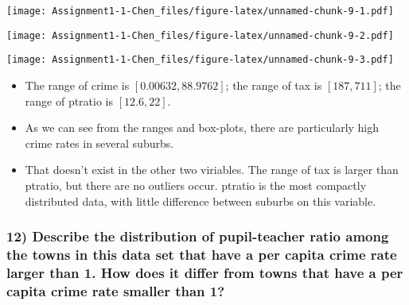 \documentclass[
  12pt,
]{article}
\newenvironment{Shaded}{\begin{snugshade}}{\end{snugshade}}
\newcommand{\AttributeTok}[1]{\textcolor[rgb]{0.77,0.63,0.00}{#1}}
\newcommand{\FunctionTok}[1]{\textcolor[rgb]{0.00,0.00,0.00}{#1}}
\newcommand{\NormalTok}[1]{#1}
\newcommand{\SpecialCharTok}[1]{\textcolor[rgb]{0.00,0.00,0.00}{#1}}
\newcommand{\StringTok}[1]{\textcolor[rgb]{0.31,0.60,0.02}{#1}}
\providecommand{\tightlist}{%
  \setlength{\itemsep}{0pt}\setlength{\parskip}{0pt}}
\begin{document}
\texttt{[image: Assignment1-1-Chen\_files/figure-latex/unnamed-chunk-9-1.pdf]}

\begin{Shaded}
\end{Shaded}

\texttt{[image: Assignment1-1-Chen\_files/figure-latex/unnamed-chunk-9-2.pdf]}

\begin{Shaded}
\end{Shaded}

\texttt{[image: Assignment1-1-Chen\_files/figure-latex/unnamed-chunk-9-3.pdf]}

\begin{itemize}
\tightlist
\item
  The range of crime is \([0.00632, 88.9762]\); the range of tax is
  \([187, 711]\); the range of ptratio is \([12.6, 22]\).
\item
  As we can see from the ranges and box-plots, there are particularly
  high crime rates in several suburbs.
\item
  That doesn't exist in the other two viriables. The range of tax is
  larger than ptratio, but there are no outliers occur. ptratio is the
  most compactly distributed data, with little difference between
  suburbs on this variable.
\end{itemize}

\hypertarget{describe-the-distribution-of-pupil-teacher-ratio-among-the-towns-in-this-data-set-that-have-a-per-capita-crime-rate-larger-than-1.-how-does-it-differ-from-towns-that-have-a-per-capita-crime-rate-smaller-than-1}{%
\subsubsection{12) Describe the distribution of pupil-teacher ratio
among the towns in this data set that have a per capita crime rate
larger than 1. How does it differ from towns that have a per capita
crime rate smaller than
1?}\label{describe-the-distribution-of-pupil-teacher-ratio-among-the-towns-in-this-data-set-that-have-a-per-capita-crime-rate-larger-than-1.-how-does-it-differ-from-towns-that-have-a-per-capita-crime-rate-smaller-than-1}}
\end{document}
